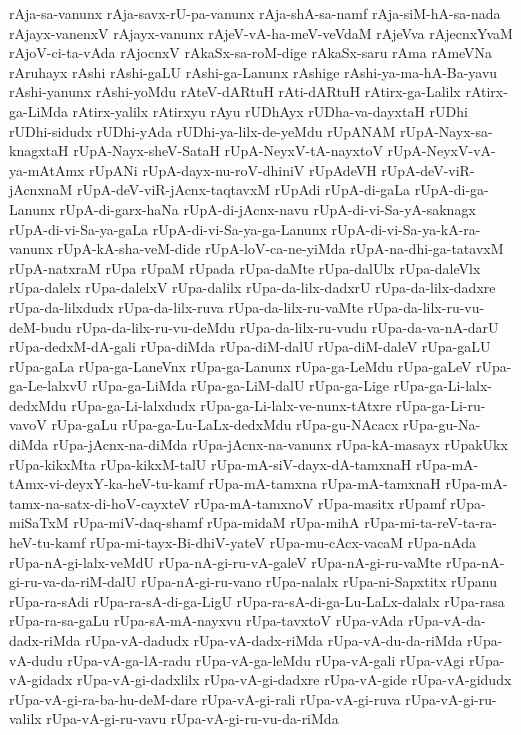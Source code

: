 {rAja-sa-vanunx
rAja-savx-rU-pa-vanunx
rAja-shA-sa-namf
rAja-siM-hA-sa-nada
rAjayx-vanenxV
rAjayx-vanunx
rAjeV-vA-ha-meV-veVdaM
rAjeVva
rAjecnxYvaM
rAjoV-ci-ta-vAda
rAjocnxV
rAkaSx-sa-roM-dige
rAkaSx-saru
rAma
rAmeVNa
rAruhayx
rAshi
rAshi-gaLU
rAshi-ga-Lanunx
rAshige
rAshi-ya-ma-hA-Ba-yavu
rAshi-yanunx
rAshi-yoMdu
rAteV-dARtuH
rAti-dARtuH
rAtirx-ga-Lalilx
rAtirx-ga-LiMda
rAtirx-yalilx
rAtirxyu
rAyu
rUDhAyx
rUDha-va-dayxtaH
rUDhi
rUDhi-sidudx
rUDhi-yAda
rUDhi-ya-lilx-de-yeMdu
rUpANAM
rUpA-Nayx-sa-knagxtaH
rUpA-Nayx-sheV-SataH
rUpA-NeyxV-tA-nayxtoV
rUpA-NeyxV-vA-ya-mAtAmx
rUpANi
rUpA-dayx-nu-roV-dhiniV
rUpAdeVH
rUpA-deV-viR-jAcnxnaM
rUpA-deV-viR-jAcnx-taqtavxM
rUpAdi
rUpA-di-gaLa
rUpA-di-ga-Lanunx
rUpA-di-garx-haNa
rUpA-di-jAcnx-navu
rUpA-di-vi-Sa-yA-saknagx
rUpA-di-vi-Sa-ya-gaLa
rUpA-di-vi-Sa-ya-ga-Lanunx
rUpA-di-vi-Sa-ya-kA-ra-vanunx
rUpA-kA-sha-veM-dide
rUpA-loV-ca-ne-yiMda
rUpA-na-dhi-ga-tatavxM
rUpA-natxraM
rUpa
rUpaM
rUpada
rUpa-daMte
rUpa-dalUlx
rUpa-daleVlx
rUpa-dalelx
rUpa-dalelxV
rUpa-dalilx
rUpa-da-lilx-dadxrU
rUpa-da-lilx-dadxre
rUpa-da-lilxdudx
rUpa-da-lilx-ruva
rUpa-da-lilx-ru-vaMte
rUpa-da-lilx-ru-vu-deM-budu
rUpa-da-lilx-ru-vu-deMdu
rUpa-da-lilx-ru-vudu
rUpa-da-va-nA-darU
rUpa-dedxM-dA-gali
rUpa-diMda
rUpa-diM-dalU
rUpa-diM-daleV
rUpa-gaLU
rUpa-gaLa
rUpa-ga-LaneVnx
rUpa-ga-Lanunx
rUpa-ga-LeMdu
rUpa-gaLeV
rUpa-ga-Le-lalxvU
rUpa-ga-LiMda
rUpa-ga-LiM-dalU
rUpa-ga-Lige
rUpa-ga-Li-lalx-dedxMdu
rUpa-ga-Li-lalxdudx
rUpa-ga-Li-lalx-ve-nunx-tAtxre
rUpa-ga-Li-ru-vavoV
rUpa-gaLu
rUpa-ga-Lu-LaLx-dedxMdu
rUpa-gu-NAcacx
rUpa-gu-Na-diMda
rUpa-jAcnx-na-diMda
rUpa-jAcnx-na-vanunx
rUpa-kA-masayx
rUpakUkx
rUpa-kikxMta
rUpa-kikxM-talU
rUpa-mA-siV-dayx-dA-tamxnaH
rUpa-mA-tAmx-vi-deyxY-ka-heV-tu-kamf
rUpa-mA-tamxna
rUpa-mA-tamxnaH
rUpa-mA-tamx-na-satx-di-hoV-cayxteV
rUpa-mA-tamxnoV
rUpa-masitx
rUpamf
rUpa-miSaTxM
rUpa-miV-daq-shamf
rUpa-midaM
rUpa-mihA
rUpa-mi-ta-reV-ta-ra-heV-tu-kamf
rUpa-mi-tayx-Bi-dhiV-yateV
rUpa-mu-cAcx-vacaM
rUpa-nAda
rUpa-nA-gi-lalx-veMdU
rUpa-nA-gi-ru-vA-galeV
rUpa-nA-gi-ru-vaMte
rUpa-nA-gi-ru-va-da-riM-dalU
rUpa-nA-gi-ru-vano
rUpa-nalalx
rUpa-ni-Sapxtitx
rUpanu
rUpa-ra-sAdi
rUpa-ra-sA-di-ga-LigU
rUpa-ra-sA-di-ga-Lu-LaLx-dalalx
rUpa-rasa
rUpa-ra-sa-gaLu
rUpa-sA-mA-nayxvu
rUpa-tavxtoV
rUpa-vAda
rUpa-vA-da-dadx-riMda
rUpa-vA-dadudx
rUpa-vA-dadx-riMda
rUpa-vA-du-da-riMda
rUpa-vA-dudu
rUpa-vA-ga-lA-radu
rUpa-vA-ga-leMdu
rUpa-vA-gali
rUpa-vAgi
rUpa-vA-gidadx
rUpa-vA-gi-dadxlilx
rUpa-vA-gi-dadxre
rUpa-vA-gide
rUpa-vA-gidudx
rUpa-vA-gi-ra-ba-hu-deM-dare
rUpa-vA-gi-rali
rUpa-vA-gi-ruva
rUpa-vA-gi-ru-valilx
rUpa-vA-gi-ru-vavu
rUpa-vA-gi-ru-vu-da-riMda
}
